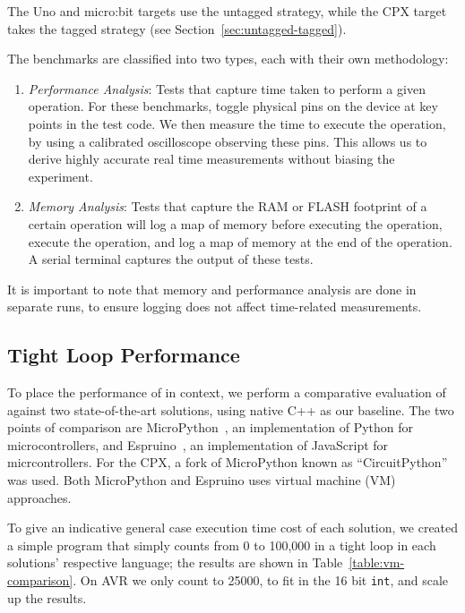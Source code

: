The Uno and micro:bit \MC targets use the untagged strategy, while the CPX target takes the tagged strategy (see Section~\ref{sec:untagged-tagged}).

The benchmarks are classified into two types, each with their own methodology:

\begin{enumerate}
    \item \textit{Performance Analysis}: Tests that capture time taken to perform a given operation. For these benchmarks, toggle physical pins on the device at key points in
    the test code. We then measure the time to
   execute the operation, by using a calibrated oscilloscope observing these pins. This allows us to derive highly accurate real time
   measurements without biasing the experiment.

    \item \textit{Memory Analysis}: Tests that capture the RAM or FLASH footprint of a certain operation will log a map of memory
    before executing the operation, execute the operation, and log a map of memory at the end of the operation.
    A serial terminal captures the output of these tests.
\end{enumerate}

It is important to note that memory and performance analysis are done in separate runs,
to ensure logging does not affect time-related measurements.

\subsection{Tight Loop Performance}

To place the performance of \MC in context, we perform a comparative evaluation of \MC against two state-of-the-art
solutions, using native C++ as our baseline. The two points of comparison are MicroPython~\cite{MicroPython}, an implementation
of Python for microcontrollers, and Espruino~\cite{espruinoBook}, an implementation of JavaScript for micrcontrollers.
For the CPX, a fork of MicroPython known as ``CircuitPython'' was used. Both MicroPython and Espruino uses virtual machine (VM) approaches.

To give an indicative general case execution time cost of each solution, we created a simple program that simply
counts from 0 to 100,000 in a tight loop in each solutions' respective language;
the results are shown in Table~\ref{table:vm-comparison}.
On AVR we only count to 25000, to fit in the 16 bit \texttt{int}, and scale up the results.

